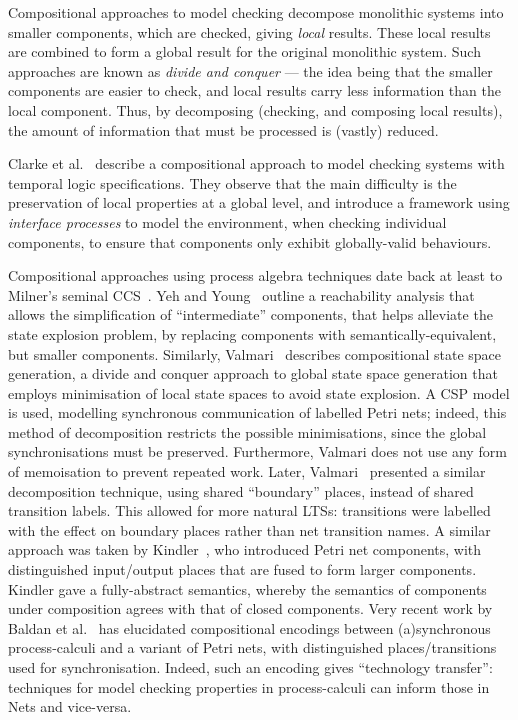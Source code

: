 Compositional approaches to model checking decompose monolithic systems into
smaller components, which are checked, giving \emph{local} results. These local
results are combined to form a global result for the original monolithic
system. Such approaches are known as \emph{divide and conquer} --- the idea
being that the smaller components are easier to check, and local results carry
less information than the local component. Thus, by decomposing (checking, and
composing local results), the amount of information that must be processed is
(vastly) reduced.

Clarke et al.~\cite{Clarke1989} describe a compositional approach to model
checking systems with temporal logic specifications. They observe that the main
difficulty is the preservation of local properties at a global level, and
introduce a framework using \emph{interface processes} to model the
environment, when checking individual components, to ensure that components
only exhibit globally-valid behaviours.

Compositional approaches using process algebra techniques date back at least to
Milner's seminal CCS~\cite{Milner1980}. Yeh and Young~\cite{Yeh1991} outline a
reachability analysis that allows the simplification of ``intermediate''
components, that helps alleviate the state explosion problem, by replacing
components with semantically-equivalent, but smaller components. Similarly,
Valmari~\cite{Valmari1993,Valmari1996} describes compositional state space
generation, a divide and conquer approach to global state space generation that
employs minimisation of local state spaces to avoid state explosion. A CSP
model is used, modelling synchronous communication of labelled Petri nets;
indeed, this method of decomposition restricts the possible minimisations,
since the global synchronisations must be preserved.  Furthermore, Valmari does
not use any form of memoisation to prevent repeated work.  Later,
Valmari~\cite{Valmari1994} presented a similar decomposition technique, using
shared ``boundary'' places, instead of shared transition labels. This allowed
for more natural LTSs: transitions were labelled with the effect on boundary
places rather than net transition names. A similar approach was taken by
Kindler~\cite{Kindler1997}, who introduced Petri net components, with
distinguished input/output places that are fused to form larger components.
Kindler gave a fully-abstract semantics, whereby the semantics of
components under composition agrees with that of closed components.  Very
recent work by {Baldan et al.}~\cite{Baldan2015} has elucidated compositional
encodings between (a)synchronous process-calculi and a variant of Petri nets,
with distinguished places/transitions used for synchronisation.  Indeed, such
an encoding gives ``technology transfer'': techniques for model
checking properties in process-calculi can inform those in Nets and vice-versa.

